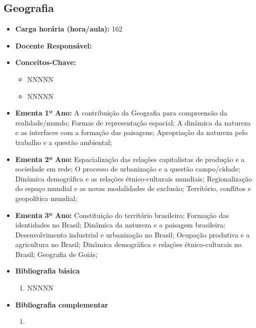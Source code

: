 \documentclass[11pt,fleqn]{book} %
\begin{document}
\subsection{Geografia}\label{disc:geografia}
\begin{itemize}
	\item \textbf{Carga horária (hora/aula):} 162
	\item \textbf{Docente Responsável:}
	\item \textbf{Conceitos-Chave:}
	\begin{itemize}
		\item NNNNN
		\item NNNNN
	\end{itemize}
	\item \textbf{Ementa 1º Ano:} 
	A contribuição da Geografia para compreensão da realidade/mundo;
	Formas de representação espacial;
	A dinâmica da natureza e as interfaces com a formação das paisagens;
	Apropriação da natureza pelo trabalho e a questão ambiental;
	\item \textbf{Ementa 2º Ano:} 	
	Espacialização das relações capitalistas de produção e a sociedade em rede;
	O processo de urbanização e a questão campo/cidade;
	Dinâmica demográfica e as relações étnico-culturais mundiais;
	Regionalização do espaço mundial e as novas modalidades de exclusão;
	Território, conflitos e geopolítica mundial;
	\item \textbf{Ementa 3º Ano:} 	
	Constituição do território brasileiro;
	Formação das identidades no Brasil; 
	Dinâmica da natureza e a paisagem brasileira;
	Desenvolvimento industrial e urbanização no Brasil;
	Ocupação produtiva e a agricultura no Brasil; 
	Dinâmica demográfica e relações étnico-culturais no Brasil;
	Geografia de Goiás;
	\item \textbf{Bibliografia básica}
	\begin{enumerate}
		\item NNNNN
	\end{enumerate}
	\item \textbf{Bibliografia complementar}
	\begin{enumerate}
		\item 
	\end{enumerate}	
\end{itemize}


\newpage
\end{document}
